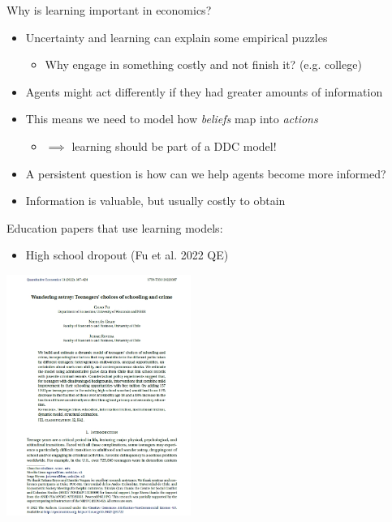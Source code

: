 \documentclass[aspectratio=169]{beamer}
\begin{document}
\begin{frame}

Why is learning important in economics?

\bigskip{}

\begin{itemize}
\itemsep1.5em
\item<2-> Uncertainty and learning can explain some empirical puzzles
\bigskip\par
    \begin{itemize}
    \item<3-> Why engage in something costly and not finish it? (e.g. college)
    \end{itemize}
\item<4-> Agents might act differently if they had greater amounts of information
\item<5-> This means we need to model how \textit{beliefs} map into \textit{actions}
\bigskip\par
    \begin{itemize}
    \item<6-> $\implies$ learning should be part of a DDC model!
    \end{itemize}
\item<7-> A persistent question is how can we help agents become more informed?
\item<8-> Information is valuable, but usually costly to obtain
\end{itemize}

\end{frame}










\begin{frame}
Education papers that use learning models:
\bigskip\par
\begin{itemize}
\itemsep1.5em
\item High school dropout (Fu et al. 2022 QE)
\end{itemize}
\end{frame}

\begin{frame}
\centering
\includegraphics[width=0.45\textwidth]{Fu_al_cover.jpg}
\end{frame}
\end{document}
